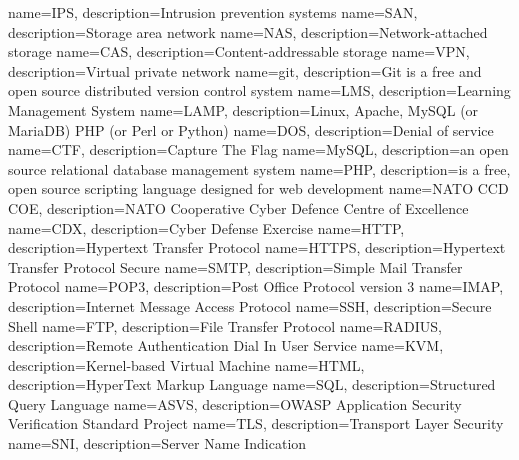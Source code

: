 {
  name=IPS,
  description={Intrusion prevention systems}
}
{
  name=SAN,
  description={Storage area network}
}
{
  name=NAS,
  description={Network-attached storage}
}
{
  name=CAS,
  description={Content-addressable storage}
}
{
  name=VPN,
  description={Virtual private network}
}
{
  name=git,
  description={Git is a free and open source distributed version control system}
}
{
  name=LMS,
  description={Learning Management System}
}
{
  name=LAMP,
  description={Linux, Apache, MySQL (or MariaDB) PHP (or Perl or Python)}
}
{
  name=DOS,
  description={Denial of service}
}
{
  name=CTF,
  description={Capture The Flag}
}
{
  name=MySQL,
  description={an open source relational database management system}
}
{
  name=PHP,
  description={is a free, open source scripting language designed for web development}
}
{
  name=NATO CCD COE,
  description={NATO Cooperative Cyber Defence Centre of Excellence}
}
{
  name=CDX,
  description={Cyber Defense Exercise}
}
{
  name=HTTP,
  description={Hypertext Transfer Protocol}
}
{
  name=HTTPS,
  description={Hypertext Transfer Protocol Secure}
}
{
  name=SMTP,
  description={Simple Mail Transfer Protocol}
}
{
  name=POP3,
  description={Post Office Protocol version 3}
}
{
  name=IMAP,
  description={Internet Message Access Protocol}
}
{
  name=SSH,
  description={Secure Shell}
}
{
  name=FTP,
  description={File Transfer Protocol}
}
{
  name=RADIUS,
  description={Remote Authentication Dial In User Service}
}
{
  name=KVM,
  description={Kernel-based Virtual Machine}
}
{
  name=HTML,
  description={HyperText Markup Language}
}
{
  name=SQL,
  description={Structured Query Language}
}
{
  name=ASVS,
  description={\gls{OWASP} Application Security Verification Standard Project}
}
{
  name=TLS,
  description={Transport Layer Security}
}
{
  name=SNI,
  description={Server Name Indication}
}